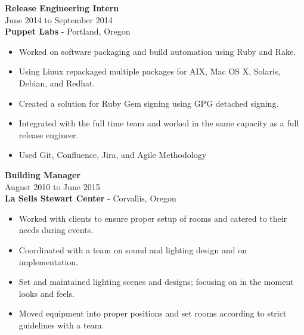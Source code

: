 \documentclass[mm]{res}
\begin{document}
\begin{resume}
\begin{itemize}
\end{itemize}
	\textbf{Release Engineering Intern} \\
	June 2014 to September 2014 \\
	\textbf{Puppet Labs} - Portland, Oregon \\
\begin{itemize} \parskip0pt  \itemsep-8pt
	\item Worked on software packaging and build automation using Ruby and Rake. \\
	\item Using Linux repackaged multiple packages for AIX, Mac OS X, Solaris, Debian, and Redhat. \\
	\item Created a solution for Ruby Gem signing using GPG detached signing. \\
	\item Integrated with the full time team and worked in the same capacity as a full release engineer. \\
	\item Used Git, Confluence, Jira, and Agile Methodology
\end{itemize}

	\textbf{Building Manager} \\
	August 2010 to June 2015 \\                
	\textbf{La Sells Stewart Center} - Corvallis, Oregon \\
\begin{itemize} \parskip0pt  \itemsep-8pt
	\item Worked with clients to ensure proper setup of rooms and catered to their needs during events. \\
	\item Coordinated with a team on sound and lighting design and on implementation. \\
	\item Set and maintained lighting scenes and designs; focusing on in the moment looks and feels. \\
	\item Moved equipment into proper positions and set rooms according to strict guidelines with a team. \\
\end{itemize}


\end{resume}
\end{document}
